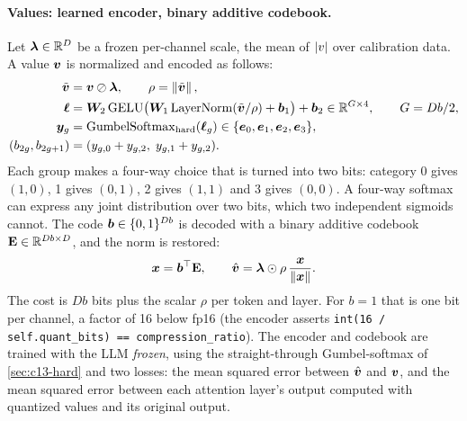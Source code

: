 \paragraph{Values: learned encoder, binary additive codebook.} Let $\bm{\lambda}\in\mathbb{R}^D$ be a frozen
per-channel scale, the mean of $\left\lvert v\right\rvert$ over calibration data. A value $\bm{v}$ is normalized and encoded
as follows:
\begin{align}
  \tilde{\bm{v}}&=\bm{v}\oslash\bm{\lambda},\qquad \rho=\left\lVert \tilde{\bm{v}}\right\rVert,\nonumber\\
  \bm{\ell} &= \bm{W}_2\,\mathrm{GELU}\bigl(\bm{W}_1\operatorname{LayerNorm}(\tilde{\bm{v}}/\rho)+\bm{b}_1\bigr)+\bm{b}_2\in\mathbb{R}^{G\times4},
  \qquad G=Db/2, \label{eq:c13-commvq-enc}\\
  \bm{y}_g &= \mathrm{GumbelSoftmax}_{\mathrm{hard}}(\bm{\ell}_g)\in\{\bm{e}_0,\bm{e}_1,\bm{e}_2,\bm{e}_3\},\nonumber\\
  (b_{2g},b_{2g+1}) &= (y_{g,0}+y_{g,2},\;y_{g,1}+y_{g,2}). \label{eq:c13-commvq-bits}
\end{align}
Each group makes a four-way choice that is turned into two bits: category 0 gives $(1,0)$, 1 gives
$(0,1)$, 2 gives $(1,1)$ and 3 gives $(0,0)$. A four-way softmax can express any joint distribution
over two bits, which two independent sigmoids cannot. The code $\bm{b}\in\{0,1\}^{Db}$ is decoded with a
binary additive codebook $\mathbf{E}\in\mathbb{R}^{Db\times D}$, and the norm is restored:
\begin{equation}\label{eq:c13-commvq-vdec}
  \bm{x}=\bm{b}^{\top}\mathbf{E},\qquad \hat{\bm{v}}=\bm{\lambda}\odot\rho\,\frac{\bm{x}}{\left\lVert \bm{x}\right\rVert}.
\end{equation}
The cost is $Db$ bits plus the scalar $\rho$ per token and layer. For $b=1$ that is one bit per
channel, a factor of 16 below fp16 (the encoder asserts \texttt{int(16 / self.quant\_bits) == compression\_ratio}).
The encoder and codebook are trained with the LLM \emph{frozen}, using the straight-through Gumbel-softmax of
\cref{sec:c13-hard} and two losses: the mean squared error between $\hat{\bm{v}}$ and $\bm{v}$, and the mean
squared error between each attention layer's output computed with quantized values and its original
output.


